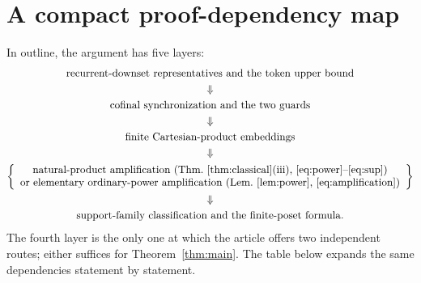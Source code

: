 \documentclass[11pt,a4paper]{article}
\numberwithin{equation}{section}
\theoremstyle{definition}
\theoremstyle{remark}
\begin{document}
\clearpage
\section{A compact proof-dependency map}
\label{app:dependencies}

In outline, the argument has five layers:
\[
 \begin{gathered}
 \text{recurrent-downset representatives and the token upper bound}\\
 \Downarrow\\
 \text{cofinal synchronization and the two guards}\\
 \Downarrow\\
 \text{finite Cartesian-product embeddings}\\
 \Downarrow\\
 \left\{
 \begin{array}{c}
   \text{natural-product amplification (Thm.~\ref{thm:classical}(iii),
     \eqref{eq:power}--\eqref{eq:sup})}\\
   \text{or elementary ordinary-power amplification
     (Lem.~\ref{lem:power}, \eqref{eq:amplification})}
 \end{array}
 \right\}\\
 \Downarrow\\
 \text{support-family classification and the finite-poset formula.}
 \end{gathered}
\]
The fourth layer is the only one at which the article offers two independent
routes; either suffices for Theorem~\ref{thm:main}. The table below expands
the same dependencies statement by statement.
\end{document}
